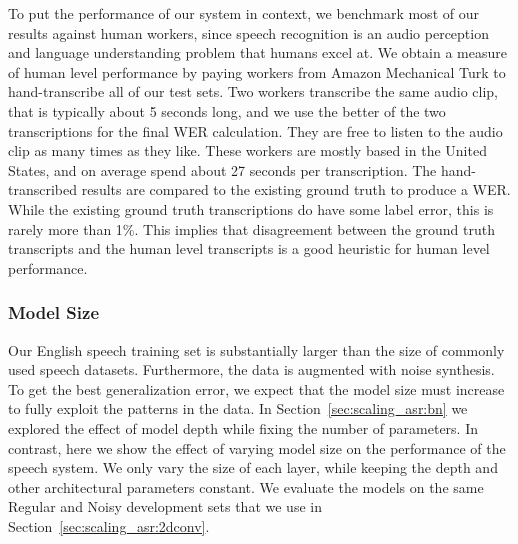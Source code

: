To put the performance of our system in context, we benchmark most of our
results against human workers, since speech recognition is an audio perception
and language understanding problem that humans excel at. We obtain a measure of
human level performance by paying workers from Amazon Mechanical Turk to
hand-transcribe all of our test sets. Two workers transcribe the same audio
clip, that is typically about 5 seconds long, and we use the better of the two
transcriptions for the final WER calculation. They are free to listen to the
audio clip as many times as they like. These workers are mostly based in the
United States, and on average spend about 27 seconds per transcription. The
hand-transcribed results are compared to the existing ground truth to produce a
WER. While the existing ground truth transcriptions do have some label error,
this is rarely more than 1\%. This implies that disagreement between the ground
truth transcripts and the human level transcripts is a good heuristic for human
level performance.

\subsubsection{Model Size}

Our English speech training set is substantially larger than the size of
commonly used speech datasets. Furthermore, the data is augmented with noise
synthesis. To get the best generalization error, we expect that the model size
must increase to fully exploit the patterns in the data. In
Section~\ref{sec:scaling_asr:bn} we explored the effect of model depth while
fixing the number of parameters. In contrast, here we show the effect of
varying model size on the performance of the speech system. We only vary the
size of each layer, while keeping the depth and other architectural parameters
constant. We evaluate the models on the same Regular and Noisy development sets
that we use in Section~\ref{sec:scaling_asr:2dconv}.

